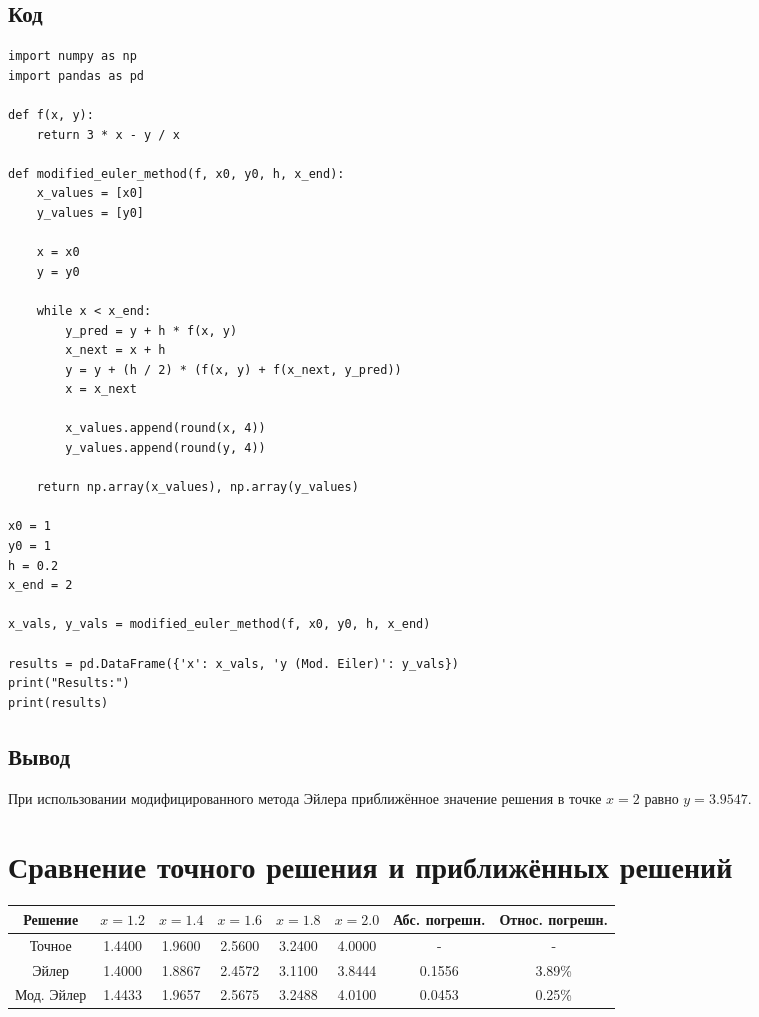 \documentclass[a4paper,12pt]{article}
\begin{document}
\subsection*{Код}

\begin{lstlisting}
import numpy as np
import pandas as pd

def f(x, y):
    return 3 * x - y / x

def modified_euler_method(f, x0, y0, h, x_end):
    x_values = [x0]
    y_values = [y0]
    
    x = x0
    y = y0
    
    while x < x_end:
        y_pred = y + h * f(x, y)   
        x_next = x + h           
        y = y + (h / 2) * (f(x, y) + f(x_next, y_pred))  
        x = x_next
        
        x_values.append(round(x, 4))  
        y_values.append(round(y, 4)) 
    
    return np.array(x_values), np.array(y_values)

x0 = 1    
y0 = 1    
h = 0.2   
x_end = 2

x_vals, y_vals = modified_euler_method(f, x0, y0, h, x_end)

results = pd.DataFrame({'x': x_vals, 'y (Mod. Eiler)': y_vals})
print("Results:")
print(results)

\end{lstlisting}
\subsection*{Вывод}
При использовании модифицированного метода Эйлера приближённое значение решения в точке \( x = 2 \) равно \( y = 3.9547 \).








\section{Сравнение точного решения и приближённых решений}

\begin{table}[h!]
\centering

\begin{tabular}{|c|c|c|c|c|c|c|c|}
\hline
Решение & \( x = 1.2 \) & \( x = 1.4 \) & \( x = 1.6 \) & \( x = 1.8 \) & \( x = 2.0 \) & Абс. погрешн. & Относ. погрешн. \\ \hline
Точное & 1.4400 & 1.9600 & 2.5600 & 3.2400 & 4.0000 & - & - \\ \hline
Эйлер & 1.4000 & 1.8867 & 2.4572 & 3.1100 & 3.8444 & 0.1556 & 3.89\% \\ \hline
Мод. Эйлер & 1.4433 & 1.9657 & 2.5675 & 3.2488 & 4.0100 & 0.0453 & 0.25\% \\ \hline 
\end{tabular}
\end{table}
\end{document}
